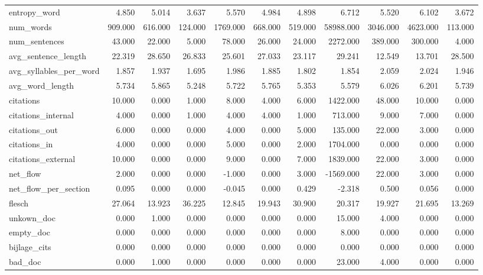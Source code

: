 \begin{tabular}{lrrrrrrrrrr}
\cline{1-11}
entropy\_word & 4.850 & 5.014 & 3.637 & 5.570 & 4.984 & 4.898 & 6.712 & 5.520 & 6.102 & 3.672 \\
\cline{1-11}
num\_words & 909.000 & 616.000 & 124.000 & 1769.000 & 668.000 & 519.000 & 58988.000 & 3046.000 & 4623.000 & 113.000 \\
\cline{1-11}
num\_sentences & 43.000 & 22.000 & 5.000 & 78.000 & 26.000 & 24.000 & 2272.000 & 389.000 & 300.000 & 4.000 \\
\cline{1-11}
avg\_sentence\_length & 22.319 & 28.650 & 26.833 & 25.601 & 27.033 & 23.117 & 29.241 & 12.549 & 13.701 & 28.500 \\
\cline{1-11}
avg\_syllables\_per\_word & 1.857 & 1.937 & 1.695 & 1.986 & 1.885 & 1.802 & 1.854 & 2.059 & 2.024 & 1.946 \\
\cline{1-11}
avg\_word\_length & 5.734 & 5.865 & 5.248 & 5.722 & 5.765 & 5.353 & 5.579 & 6.026 & 6.201 & 5.739 \\
\cline{1-11}
citations & 10.000 & 0.000 & 1.000 & 8.000 & 4.000 & 6.000 & 1422.000 & 48.000 & 10.000 & 0.000 \\
\cline{1-11}
citations\_internal & 4.000 & 0.000 & 1.000 & 4.000 & 4.000 & 1.000 & 713.000 & 9.000 & 7.000 & 0.000 \\
\cline{1-11}
citations\_out & 6.000 & 0.000 & 0.000 & 4.000 & 0.000 & 5.000 & 135.000 & 22.000 & 3.000 & 0.000 \\
\cline{1-11}
citations\_in & 4.000 & 0.000 & 0.000 & 5.000 & 0.000 & 2.000 & 1704.000 & 0.000 & 0.000 & 0.000 \\
\cline{1-11}
citations\_external & 10.000 & 0.000 & 0.000 & 9.000 & 0.000 & 7.000 & 1839.000 & 22.000 & 3.000 & 0.000 \\
\cline{1-11}
net\_flow & 2.000 & 0.000 & 0.000 & -1.000 & 0.000 & 3.000 & -1569.000 & 22.000 & 3.000 & 0.000 \\
\cline{1-11}
net\_flow\_per\_section & 0.095 & 0.000 & 0.000 & -0.045 & 0.000 & 0.429 & -2.318 & 0.500 & 0.056 & 0.000 \\
\cline{1-11}
flesch & 27.064 & 13.923 & 36.225 & 12.845 & 19.943 & 30.900 & 20.317 & 19.927 & 21.695 & 13.269 \\
\cline{1-11}
unkown\_doc & 0.000 & 1.000 & 0.000 & 0.000 & 0.000 & 0.000 & 15.000 & 4.000 & 0.000 & 0.000 \\
\cline{1-11}
empty\_doc & 0.000 & 0.000 & 0.000 & 0.000 & 0.000 & 0.000 & 8.000 & 0.000 & 0.000 & 0.000 \\
\cline{1-11}
bijlage\_cits & 0.000 & 0.000 & 0.000 & 0.000 & 0.000 & 0.000 & 0.000 & 0.000 & 0.000 & 0.000 \\
\cline{1-11}
bad\_doc & 0.000 & 1.000 & 0.000 & 0.000 & 0.000 & 0.000 & 23.000 & 4.000 & 0.000 & 0.000 \\
\cline{1-11}
\bottomrule
\end{tabular}
